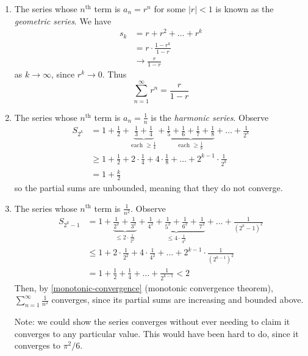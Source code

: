 \documentclass{../template/note}
\begin{document}
    \begin{example}
        \begin{enumerate}[label=\protect\circled{\arabic*}]
            \item The series whose \(n^\text{th}\) term is \(a_n = r^n\) for some \(|r| < 1\) is known as the \emph{geometric series}. We have
            \begin{align*}
                s_k &= r + r^2 + \dots + r^k \\
                &= r \cdot \frac{1-r^k}{1-r} \\
                &\to \frac{r}{1-r}
            \end{align*}
            as \(k \to \infty\), since \(r^k \to 0\). Thus
            \[
                \sum_{n=1}^\infty r^n = \frac{r}{1-r}
            \]
            \item The series whose \(n^\text{th}\) term is \(a_n = \frac{1}{n}\) is the \emph{harmonic series}. Observe
            \begin{align*}
                S_{2^k} &= 1 + \frac{1}{2} + \underbrace{\frac 1 3 + \frac 1 4}_{\text{each }\geq \frac 1 4} + \underbrace{\frac 1 5 + \frac 1 6 + \frac 1 7 + \frac 1 8}_{\text{each } \geq \frac 1 8} + \dots + \frac{1}{2^k} \\
                &\geq 1 + \frac{1}{2} + 2 \cdot \frac{1}{4} + 4 \cdot \frac 1 8 + \dots + 2^{k-1} \cdot \frac{1}{2^k} \\
                &= 1 + \frac{k}{2}
            \end{align*}
            so the partial sums are unbounded, meaning that they do not converge.
            \item The series whose \(n^\text{th}\) term is \(\frac{1}{n^2}\). Observe
            \begin{align*}
                S_{2^k-1} &= 1 + \underbrace{\frac{1}{2^2} + \frac{1}{3^2}}_{\leq 2 \cdot \frac{1}{2^2}} + \underbrace{\frac{1}{4^2} + \frac{1}{5^2} + \frac{1}{6^2} + \frac{1}{7^2}}_{\leq 4 \cdot \frac{1}{4^2}} + \dots + \frac{1}{(2^k-1)^2} \\
                &\leq 1 + 2 \cdot \frac{1}{2^2} + 4 \cdot \frac{1}{4^2} + \dots + 2^{k-1} \cdot \frac{1}{(2^{k-1})^2} \\
                &= 1 + \frac 1 2 + \frac 1 4 + \dots + \frac{1}{2^{k-1}} < 2
            \end{align*}
            Then, by \cref{monotonic-convergence} (monotonic convergence theorem), \(\sum_{n=1}^\infty \frac 1 {n^2}\) converges, since its partial sums are increasing and bounded above.

            Note: we could show the series converges without ever needing to claim it converges to any particular value. This would have been hard to do, since it converges to \(\pi^2/6\).
        \end{enumerate}        
    \end{example}
    
\end{document}
